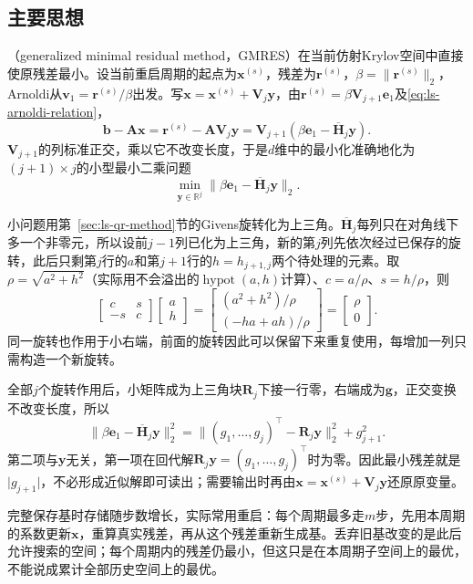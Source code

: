 \subsection{主要思想}

（generalized minimal residual method，GMRES）在当前仿射Krylov空间中直接使原残差最小。设当前重启周期的起点为$\bm x^{(s)}$，残差为$\bm r^{(s)}$，$\beta=\lVert\bm r^{(s)}\rVert_2$，Arnoldi从$\bm v_1=\bm r^{(s)}/\beta$出发。写$\bm x=\bm x^{(s)}+\bm V_j\bm y$，由$\bm r^{(s)}=\beta\bm V_{j+1}\bm e_1$及\eqref{eq:ls-arnoldi-relation}，
\[
 \bm b-\bm A\bm x=\bm r^{(s)}-\bm A\bm V_j\bm y=\bm V_{j+1}(\beta\bm e_1-\overline{\bm H}_j\bm y).
\]
$\bm V_{j+1}$的列标准正交，乘以它不改变长度，于是$d$维中的最小化准确地化为$(j+1)\times j$的小型最小二乘问题
\[
 \min_{\bm y\in\mathbb R^j}\lVert\beta\bm e_1-\overline{\bm H}_j\bm y\rVert_2 .
\]

小问题用第~\ref{sec:ls-qr-method}节的Givens旋转化为上三角。$\overline{\bm H}_j$每列只在对角线下多一个非零元，所以设前$j-1$列已化为上三角，新的第$j$列先依次经过已保存的旋转，此后只剩第$j$行的$a$和第$j+1$行的$h=h_{j+1,j}$两个待处理的元素。取$\rho=\sqrt{a^2+h^2}$（实际用不会溢出的$\operatorname{hypot}(a,h)$计算）、$c=a/\rho$、$s=h/\rho$，则
\[
 \begin{bmatrix}c&s\\-s&c\end{bmatrix}\begin{bmatrix}a\\h\end{bmatrix}
 =\begin{bmatrix}(a^2+h^2)/\rho\\(-ha+ah)/\rho\end{bmatrix}
 =\begin{bmatrix}\rho\\0\end{bmatrix}.
\]
同一旋转也作用于小右端，前面的旋转因此可以保留下来重复使用，每增加一列只需构造一个新旋转。

全部$j$个旋转作用后，小矩阵成为上三角块$\bm R_j$下接一行零，右端成为$\bm g$，正交变换不改变长度，所以
\[
 \lVert\beta\bm e_1-\overline{\bm H}_j\bm y\rVert_2^2=\lVert(g_1,\ldots,g_j)^\top-\bm R_j\bm y\rVert_2^2+g_{j+1}^2 .
\]
第二项与$\bm y$无关，第一项在回代解$\bm R_j\bm y=(g_1,\ldots,g_j)^\top$时为零。因此最小残差就是$\lvert g_{j+1}\rvert$，不必形成近似解即可读出；需要输出时再由$\bm x=\bm x^{(s)}+\bm V_j\bm y$还原原变量。

完整保存基时存储随步数增长，实际常用重启：每个周期最多走$m$步，先用本周期的系数更新$\bm x$，重算真实残差，再从这个残差重新生成基。丢弃旧基改变的是此后允许搜索的空间；每个周期内的残差仍最小，但这只是在本周期子空间上的最优，不能说成累计全部历史空间上的最优。

